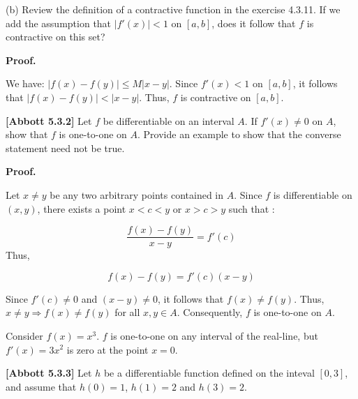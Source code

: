 \documentclass[10pt]{article}
\begin{document}
(b) Review the definition of a contractive function in the exercise 4.3.11. If we add the assumption that $\displaystyle |f'( x) |< 1$ on $\displaystyle [ a,b]$, does it follow that $\displaystyle f$ is contractive on this set?



\textbf{Proof.}



We have: $\displaystyle |f( x) -f( y) |\leq M|x-y|$. Since $\displaystyle f'( x) < 1$ on $\displaystyle [ a,b]$, it follows that $\displaystyle |f( x) -f( y) |< |x-y|$. Thus, $\displaystyle f$ is contractive on $\displaystyle [ a,b]$.



\textbf{[Abbott 5.3.2]} Let $\displaystyle f$ be differentiable on an interval $\displaystyle A$. If $\displaystyle f'( x) \neq 0$ on $\displaystyle A$, show that $\displaystyle f$ is one-to-one on $\displaystyle A$. Provide an example to show that the converse statement need not be true.



\textbf{Proof.} 



Let $\displaystyle x\neq y$ be any two arbitrary points contained in $\displaystyle A$. Since $\displaystyle f$ is differentiable on $\displaystyle ( x,y)$, there exists a point $\displaystyle x< c< y$ or $\displaystyle x >c >y$ such that :




\begin{equation*}
\frac{f( x) -f( y)}{x-y} =f'( c)
\end{equation*}
Thus,


\begin{equation*}
f( x) -f( y) =f'( c)( x-y)
\end{equation*}


Since $\displaystyle f'( c) \neq 0$ and $\displaystyle ( x-y) \neq 0$, it follows that $\displaystyle f( x) \neq f( y)$. Thus, $\displaystyle x\neq y\Longrightarrow f( x) \neq f( y)$ for all $\displaystyle x,y\in A$. Consequently, $\displaystyle f$ is one-to-one on $\displaystyle A$.



Consider $\displaystyle f( x) =x^{3}$. $\displaystyle f$ is one-to-one on any interval of the real-line, but $\displaystyle f'( x) =3x^{2}$ is zero at the point $\displaystyle x=0$. 



\textbf{[Abbott 5.3.3]} Let $\displaystyle h$ be a differentiable function defined on the inteval $\displaystyle [ 0,3]$, and assume that $\displaystyle h( 0) =1$, $\displaystyle h( 1) =2$ and $\displaystyle h( 3) =2$. 
\end{document}
